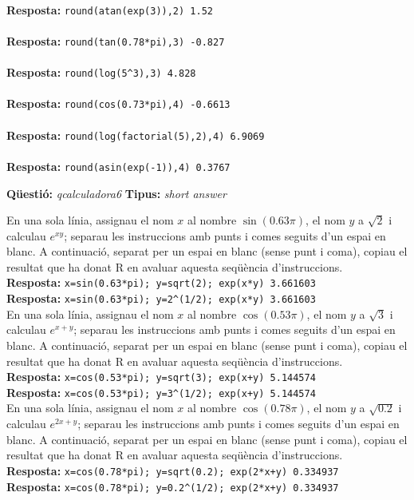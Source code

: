 \documentclass[10pt]{article}
\newcommand{\answer}{\textbf{Resposta: }}
\newcommand{\newquestion}[2]{\noindent\textbf{Qüestió: }\emph{#1} \textbf{Tipus: }\emph{#2}\medskip}
\begin{document}
\\
\answer{\verb?round(atan(exp(3)),2) 1.52?}\\

\\
\answer{\verb?round(tan(0.78*pi),3) -0.827?}\\

\\
\answer{\verb?round(log(5^3),3) 4.828?}\\

\\
\answer{\verb?round(cos(0.73*pi),4) -0.6613?}\\

\\
\answer{\verb?round(log(factorial(5),2),4) 6.9069?}\\

\\
\answer{\verb?round(asin(exp(-1)),4) 0.3767?}\\

\newpage

\newquestion{qcalculadora6}{short answer} 
\def\qcalculadora6#1#2#3{En una sola línia, assignau el nom $x$ al nombre $#1$, el nom $y$ a $#2$ i calculau $#3$; separau les instruccions amb punts i comes seguits d'un espai en blanc. A continuació, separat per un espai en blanc (sense punt i coma), copiau  el resultat que ha donat R en avaluar aquesta seqüència d'instruccions.}

\qcalculadora6{\sin(0.63\pi)}{\sqrt{2}}{e^{x y}}\\
\answer{\verb?x=sin(0.63*pi); y=sqrt(2); exp(x*y) 3.661603?}\\
\answer{\verb?x=sin(0.63*pi); y=2^(1/2); exp(x*y) 3.661603?}\\

\qcalculadora6{\cos(0.53\pi)}{\sqrt{3}}{e^{x+y}}\\
\answer{\verb?x=cos(0.53*pi); y=sqrt(3); exp(x+y) 5.144574?}\\
\answer{\verb?x=cos(0.53*pi); y=3^(1/2); exp(x+y) 5.144574?}\\

\qcalculadora6{\cos(0.78\pi)}{\sqrt{0.2}}{e^{2x+y}}\\
\answer{\verb?x=cos(0.78*pi); y=sqrt(0.2); exp(2*x+y) 0.334937?}\\
\answer{\verb?x=cos(0.78*pi); y=0.2^(1/2); exp(2*x+y) 0.334937?}\\
\end{document}
